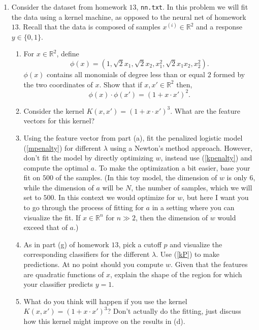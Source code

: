 \documentclass[11pt]{article}
\begin{document}
\begin{enumerate}
\item Consider the dataset from homework $13$, \verb+nn.txt+.   In this problem we will fit the data using a kernel machine, as opposed to the neural net of homework $13$.  Recall that the data is composed of samples $x^{(i)} \in \mathbb{R}^2$ and a response $y \in \{0,1\}$.  
\begin{enumerate}
\item For $x \in \mathbb{R}^2$, define 
\begin{equation}
\phi(x) = (1, \sqrt{2} x_1, \sqrt{2} x_2, x_1^2, \sqrt{2}x_1x_2, x_2^2).
\end{equation}
$\phi(x)$ contains all monomials of degree less than or equal $2$ formed by the two coordinates of $x$.  Show that if  $x,x' \in \mathbb{R}^2$ then,
\begin{equation}
\phi(x) \cdot \phi(x') = (1 + x \cdot x')^{2}.
\end{equation}
\item Consider the kernel $K(x,x') =  (1 + x \cdot x')^{3}$.  What are the feature vectors for this kernel?
\item Using the feature vector from part (a), fit the penalized logistic model (\ref{mpenalty}) for different $\lambda$ using a Newton's method approach.  However, don't fit the model by directly optimizing $w$, instead use (\ref{kpenalty}) and compute the optimal $a$.  To make the optimization a bit easier, base your fit on $500$ of the samples.   (In this toy model, the dimension of $w$ is only $6$, while the dimension of $a$ will be $N$, the number of samples, which we will set to $500$.   In this context we would optimize for $w$, but here I want you to go through the process of fitting for $a$ in a setting where you can visualize the fit.  If $x \in \mathbb{R}^n$ for $n \gg 2$, then the dimension of $w$ would exceed that of $a$.)  
\item As in part (g) of homework $13$, pick a cutoff $p$ and visualize the corresponding classifiers for the different $\lambda$.   Use (\ref{kP}) to make predictions.  At no point should you compute $w$.  Given that the features are quadratic functions of $x$, explain the shape of the region for which your classifier predicts $y=1$.
\item What do you think will happen if you use the kernel $K(x,x') =  (1 + x \cdot x')^{3}$?  Don't actually do the fitting, just discuss how this kernel might improve on the results in (d).
\end{enumerate}

\end{enumerate}
\end{document}
